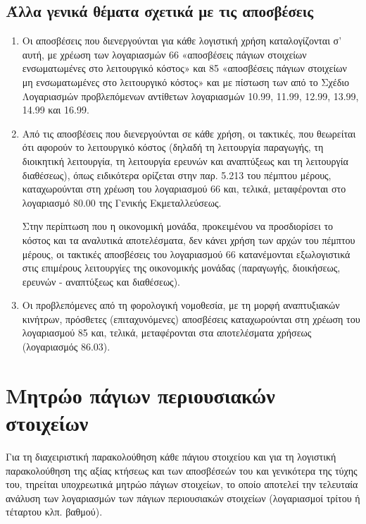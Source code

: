 \documentclass[A4,10pt,greek]{book}
\begin{document}
\subsection{Άλλα γενικά θέματα σχετικά με τις αποσβέσεις}
\begin{enumerate}

\item Οι αποσβέσεις που διενεργούνται για κάθε λογιστική χρήση καταλογίζονται σ' αυτή, με χρέωση των λογαριασμών 66 «αποσβέσεις πάγιων στοιχείων ενσωματωμένες στο λειτουργικό κόστος» και 85 «αποσβέσεις πάγιων στοιχείων μη ενσωματωμένες στο λειτουργικό κόστος» και με πίστωση των από το Σχέδιο Λογαριασμών προβλεπόμενων αντίθετων λογαριασμών 10.99, 11.99, 12.99, 13.99, 14.99 και 16.99.

\item Από τις αποσβέσεις που διενεργούνται σε κάθε χρήση, οι τακτικές, που θεωρείται ότι αφορούν το λειτουργικό κόστος (δηλαδή τη λειτουργία παραγωγής, τη διοικητική λειτουργία, τη λειτουργία ερευνών και αναπτύξεως και τη λειτουργία διαθέσεως), όπως ειδικότερα ορίζεται στην παρ. 5.213 του πέμπτου μέρους, καταχωρούνται στη χρέωση του λογαριασμού 66 και, τελικά, μεταφέρονται στο λογαριασμό 80.00 της Γενικής Εκμεταλλεύσεως.

Στην περίπτωση που η οικονομική μονάδα, προκειμένου να προσδιορίσει το κόστος και τα αναλυτικά αποτελέσματα, δεν κάνει χρήση των αρχών του πέμπτου μέρους, οι τακτικές αποσβέσεις του λογαριασμού 66 κατανέμονται εξωλογιστικά στις επιμέρους λειτουργίες της οικονομικής μονάδας (παραγωγής, διοικήσεως, ερευνών - αναπτύξεως και διαθέσεως).

\item Οι προβλεπόμενες από τη φορολογική νομοθεσία, με τη μορφή αναπτυξιακών κινήτρων, πρόσθετες (επιταχυνόμενες) αποσβέσεις καταχωρούνται στη χρέωση του λογαριασμού 85 και, τελικά, μεταφέρονται στα αποτελέσματα χρήσεως (λογαριασμός 86.03).
\end{enumerate}

\section{Μητρώο πάγιων περιουσιακών στοιχείων}
Για τη διαχειριστική παρακολούθηση κάθε πάγιου στοιχείου και για τη λογιστική παρακολούθηση της αξίας κτήσεως και των αποσβέσεών του και γενικότερα της τύχης του, τηρείται υποχρεωτικά μητρώο πάγιων στοιχείων, το οποίο αποτελεί την τελευταία ανάλυση των λογαριασμών των πάγιων περιουσιακών στοιχείων (λογαριασμοί τρίτου ή τέταρτου κλπ. βαθμού).
\end{document}
